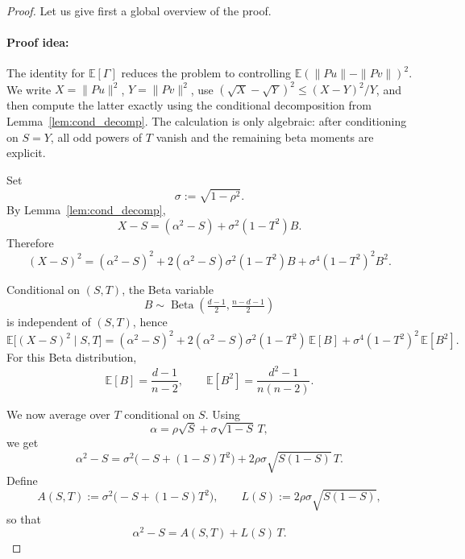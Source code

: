 \documentclass[10pt,a4paper]{amsart}
\DeclareMathOperator{\BetaDist}{Beta}
\begin{document}
\begin{proof}
Let us give first a global overview of the proof.
\paragraph{Proof idea:}
The identity for \(\mathbb E[\Gamma]\) reduces the problem to controlling
\(\mathbb E(\|Pu\|-\|Pv\|)^2\). We write
\(X=\|Pu\|^2\), \(Y=\|Pv\|^2\), use
\((\sqrt X-\sqrt Y)^2\le (X-Y)^2/Y\), and then compute the latter exactly using
the conditional decomposition from Lemma~\ref{lem:cond_decomp}. The calculation
is only algebraic: after conditioning on \(S=Y\), all odd powers of \(T\)
vanish and the remaining beta moments are explicit.



Set
\[
\sigma:=\sqrt{1-\rho^2}.
\]
By Lemma~\ref{lem:cond_decomp},
\begin{equation}
X-S=(\alpha^2-S)+\sigma^2(1-T^2)B.
\label{eq:Delta_split_corrected}
\end{equation}
Therefore
\begin{equation}
(X-S)^2
=
(\alpha^2-S)^2
+
2(\alpha^2-S)\sigma^2(1-T^2)B
+
\sigma^4(1-T^2)^2B^2.
\label{eq:expand_square_corrected}
\end{equation}

Conditional on $(S,T)$, the Beta variable
\[
B\sim \BetaDist\!\left(\tfrac{d-1}{2},\tfrac{n-d-1}{2}\right)
\]
is independent of $(S,T)$, hence
\begin{equation}
\mathbb E\big[(X-S)^2\mid S,T\big]
=
(\alpha^2-S)^2
+
2(\alpha^2-S)\sigma^2(1-T^2)\,\mathbb E[B]
+
\sigma^4(1-T^2)^2\,\mathbb E[B^2].
\label{eq:cond_second_moment_corrected}
\end{equation}
For this Beta distribution,
\begin{equation}
\mathbb E[B]=\frac{d-1}{n-2},
\qquad
\mathbb E[B^2]=\frac{d^2-1}{n(n-2)}.
\label{eq:B_moments_corrected}
\end{equation}

We now average over $T$ conditional on $S$.
Using
\[
\alpha=\rho\sqrt S+\sigma\sqrt{1-S}\,T,
\]
we get
\begin{equation}
\alpha^2-S
=
\sigma^2\bigl(-S+(1-S)T^2\bigr)
+
2\rho\sigma\sqrt{S(1-S)}\,T.
\label{eq:alpha2_minus_S_corrected}
\end{equation}
Define
\[
A(S,T):=\sigma^2\bigl(-S+(1-S)T^2\bigr),
\qquad
L(S):=2\rho\sigma\sqrt{S(1-S)},
\]
so that
\[
\alpha^2-S=A(S,T)+L(S)\,T.
\]


\end{proof}
\end{document}
